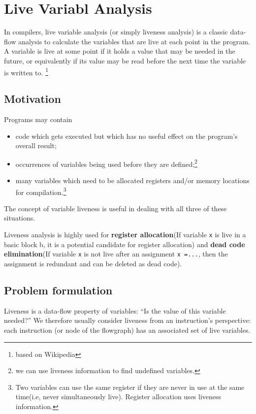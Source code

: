 \section{ Live Variabl Analysis   }

In compilers, live variable analysis (or simply liveness analysis)
is a classic data-flow analysis to calculate the variables that
are live at each point in the program. A variable is live at
some point if it holds a value that may be needed in the future,
or equivalently if its value may be read before the next time
the variable is written to. \footnote{based on Wikipedia}

\subsection{Motivation}

Programs may contain

\begin{itemize}
	\item code which gets executed but which has no useful
	      effect on the program's overall result;
	\item occurrences of variables being used before they
	      are defined;\footnote{we can use liveness information to find undefined variables.}
	\item many variables which need to be allocated
	      registers and/or memory locations for compilation.\footnote{Two	variables	can	use	the	same	register	if	they	are	never	in	use	at	the
		      same time(i.e,	never	simultaneously live). Register	allocation
		      uses liveness information.}

\end{itemize}

The concept of variable liveness is useful in dealing
with all three of these situations.


Liveness analysis is highly used for \textbf{register allocation}(If variable \texttt{x} is live in a basic block b, it is a potential candidate for
register allocation) and \textbf{dead code elimination}(If variable \texttt{x} is not live after an assignment \texttt{x =...}, then the assignment is
redundant and can be deleted as dead code).


\subsection{Problem formulation}
Liveness is a data-flow property of variables:
“Is the value of this variable needed?” We therefore
usually consider liveness from an instruction's
perspective: each instruction (or node of the
flowgraph) has an associated set of live variables.


